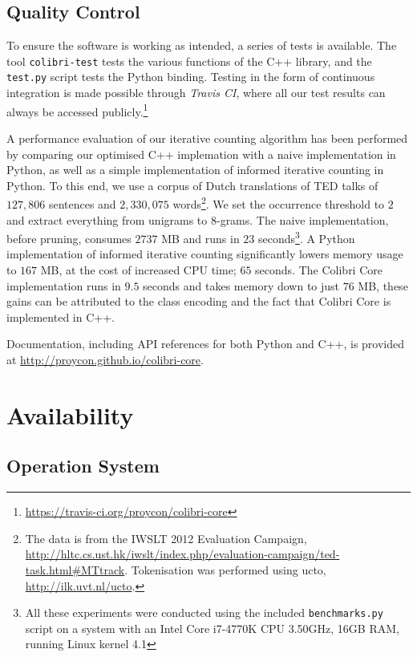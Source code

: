 \documentclass[a4paper,12pt]{article}
\begin{document}
\subsection{Quality Control}
\label{sec:qc}

To ensure the software is working as intended, a series of tests is available.
The tool \texttt{colibri-test} tests the various functions of the C++ library,
and the \texttt{test.py} script tests the Python binding. Testing in the form
of continuous integration is made possible through \emph{Travis CI}, where all
our test results can always be accessed
publicly.\footnote{\url{https://travis-ci.org/proycon/colibri-core}}

A performance evaluation of our iterative counting algorithm has been performed
by comparing our optimised C++ implemation with a naive implementation in
Python, as well as a simple implementation of informed iterative counting in
Python. To this end, we use a corpus of Dutch translations of TED talks of
$127,806$ sentences and $2,330,075$ words\footnote{The data is from the IWSLT
2012 Evaluation Campaign, \url{http://hltc.cs.ust.hk/iwslt/index.php/evaluation-campaign/ted-task.html\#MTtrack}.
Tokenisation was performed using ucto, \url{http://ilk.uvt.nl/ucto}.}. We set
the occurrence threshold to $2$ and extract everything from unigrams to
$8$-grams. The naive implementation, before pruning, consumes $2737$ MB and
runs in $23$ seconds\footnote{All these experiments were conducted using the
    included \texttt{benchmarks.py} script on a system
    with an Intel Core i7-4770K CPU \@ 3.50GHz, 16GB RAM, running Linux kernel
4.1}. A Python implementation of informed iterative counting significantly
lowers memory usage to $167$ MB, at the cost of increased CPU time; $65$
seconds. The Colibri Core implementation runs in $9.5$ seconds and takes memory
down to just $76$ MB, these gains can be attributed to the class encoding and
the fact that Colibri Core is implemented in C++.

Documentation, including API references for both Python and C++, is provided at
\url{http://proycon.github.io/colibri-core}. 

\section{Availability}

\subsection{Operation System}
\end{document}
